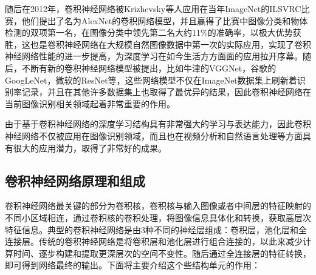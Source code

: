 随后在2012年，卷积神经网络被Krizhevsky\cite{krizhevsky2012imagenet}等人应用在当年ImageNet的ILSVRC比赛，他们提出了名为AlexNet的卷积网络模型，并且赢得了比赛中图像分类和物体检测的双项第一名，在图像分类中领先第二名大约11\%的准确率，以极大优势获胜，这也是卷积神经网络在大规模自然图像数据中第一次的实际应用，实现了卷积神经网络性能的进一步提高，为深度学习在如今生活方方面面的应用拉开序幕。随后，不断有新的卷积神经网络模型被提出，比如牛津的VGGNet\cite{simonyan2014very}，谷歌的GoogLeNet\cite{szegedy2015going}，微软的ResNet\cite{he2015deep}等，这些网络模型不仅在ImageNet数据集上刷新着识别率记录，并且在其他许多数据集上也取得了最优异的结果，因此卷积神经网络在当前图像识别相关领域起着非常重要的作用。

由于基于卷积神经网络的深度学习结构具有非常强大的学习与表达能力，因此卷积神经网络不仅被应用在图像识别领域，而且也在视频分析和自然语言处理等方面具有很大的应用潜力，取得了非常好的成果。

\subsection{卷积神经网络原理和组成}

卷积神经网络最关键的部分为卷积核，卷积核与输入图像或者中间层的特征映射的不同小区域相连，通过卷积核的卷积处理，将图像信息具体化和转换，获取高层次特征信息。典型的卷积神经网络是由3种不同的神经层组成：卷积层，池化层和全连接层。传统的卷积神经网络是将卷积层和池化层进行组合连接的，以此来减少计算时间、逐步构建和提取更深层次的空间不变性。随后通过全连接层的特征转换，即可得到网络最终的输出。下面将主要介绍这个些结构单元的作用：


